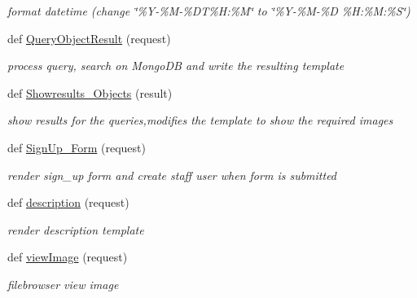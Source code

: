 \begin{DoxyCompactItemize}
\begin{DoxyCompactList}\small\item\em format datetime (change \char`\"{}\%\+Y-\/\%\+M-\/\%\+D\+T\%\+H\+:\%\+M\char`\"{} to \char`\"{}\%\+Y-\/\%\+M-\/\%\+D \%\+H\+:\%\+M\+:\%\+S\char`\"{}) \end{DoxyCompactList}\item 
def \hyperlink{namespaceimgapp_1_1views_a06d5c0cac6ae36a355b522abb883932b}{Query\+Object\+Result} (request)
\begin{DoxyCompactList}\small\item\em process query, search on Mongo\+DB and write the resulting template \end{DoxyCompactList}\item 
def \hyperlink{namespaceimgapp_1_1views_a6ce45040afbe69d047853cb4258a4761}{Showresults\+\_\+\+Objects} (result)
\begin{DoxyCompactList}\small\item\em show results for the queries,modifies the template to show the required images \end{DoxyCompactList}\item 
def \hyperlink{namespaceimgapp_1_1views_a7ff46cd0d8d9cddbd78a488b2e45ce0c}{Sign\+Up\+\_\+\+Form} (request)
\begin{DoxyCompactList}\small\item\em render sign\+\_\+up form and create staff user when form is submitted \end{DoxyCompactList}\item 
def \hyperlink{namespaceimgapp_1_1views_aad5f229f777ab6368cc67dab4436b8ac}{description} (request)
\begin{DoxyCompactList}\small\item\em render description template \end{DoxyCompactList}\item 
def \hyperlink{namespaceimgapp_1_1views_a79dd171b98f07f4649cd2e44644ab8e0}{view\+Image} (request)
\begin{DoxyCompactList}\small\item\em filebrowser view image \end{DoxyCompactList}\end{DoxyCompactItemize}
